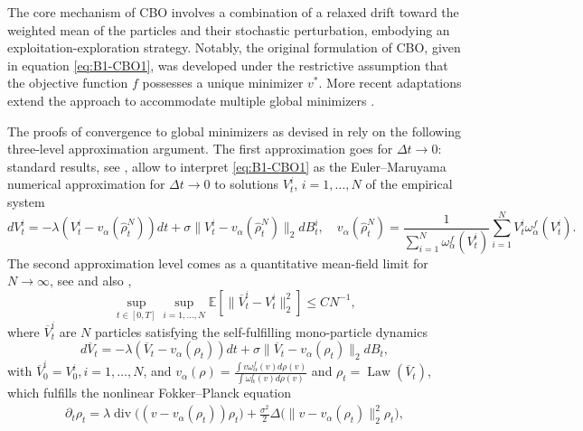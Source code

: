 \documentclass[a4paper, 11pt]{article}
\newcounter{results}[section]
\theoremstyle{plain}
\theoremstyle{remark}
\theoremstyle{definition}
\begin{document}
The core mechanism of CBO involves a combination of a relaxed drift toward the weighted mean of the particles and their stochastic perturbation, embodying an exploitation-exploration strategy. Notably, the original formulation of CBO, given in equation \eqref{eq:B1-CBO1}, was developed under the restrictive assumption that the objective function $f$ possesses a { unique} minimizer $v^*$. More recent adaptations extend the approach to accommodate multiple global minimizers \cite{B1-bungert2022polarized,B1-fornasierSun25}.  

The proofs of convergence to global minimizers as devised in \cite{carrillo2018analytical,B1-fornasier2021global} rely on the following three-level approximation argument. The first approximation goes for $\Delta t \to 0$: standard results, see \cite{platen1999introduction}, allow to interpret \eqref{eq:B1-CBO1} as  the Euler--Maruyama numerical approximation  for $\Delta t \to 0$ to solutions $V_t^i$, $i=1,\dots,N$ of the empirical system
\begin{equation}
d {V}^i_t
		=-\lambda\left(V^i_t-v_\alpha(\hat \rho_t^N )\right)dt+\sigma \|V^i_t-v_\alpha(\widehat \rho^N_t)\|_2 d B_t^i, \quad v_\alpha(\widehat \rho_t^N ) =  \frac{1 }{\sum_{i=1}^N \omega_\alpha^f(V_t^i)} \sum_{i=1}^N V_t^i \omega_\alpha^f(V_t^i).
\end{equation}
The second approximation level comes as a quantitative mean-field limit for $N \to \infty$, see \cite[Proposition 3.11]{B1-fornasier2021global} and also \cite[Theorem 2.6]{gerber2023propagation},
\begin{equation}\label{eq:qmfl}
   \sup_{t \in [0,T]}\sup_{i=1,\dots,N} \mathbb E\left [ \| \overline V^i_t -V^i_t\|_2^2\right ]  \leq CN^{-1}, 
\end{equation}
{where $\overline V^i_t$ are $N$ particles satisfying the self-fulfilling mono-particle dynamics
\begin{equation}\label{eq:B1-CBO2}
		d \overline{V}_t
		=-\lambda\left(\overline{V}_t-v_\alpha(\rho_t)\right)dt+\sigma \|\overline{V}_t-v_\alpha(\rho_t)\|_2 d B_t,
	\end{equation}
 with $\overline V^i_0=V_0^i, i=1,\ldots,N$,}   
 and  $v_\alpha(\rho)=\frac{\int v \omega^{f}_\alpha(v) d\rho(v)}{\int \omega^f_\alpha(v) d\rho(v)}$ and $\rho_t= \operatorname{Law}(\overline{V}_t)$, which fulfills the nonlinear Fokker--Planck equation
 \begin{align} \label{eq:B1-fokker_planck}
	\partial_t\rho_t
	= \lambda\operatorname{div} \big(\!\left(v - v_\alpha(\rho_t)\right)\rho_t\big)
	+ \frac{\sigma^2}{2}\Delta\big(\|v-v_\alpha(\rho_t)\|_2^2\rho_t\big),
\end{align}
\end{document}
